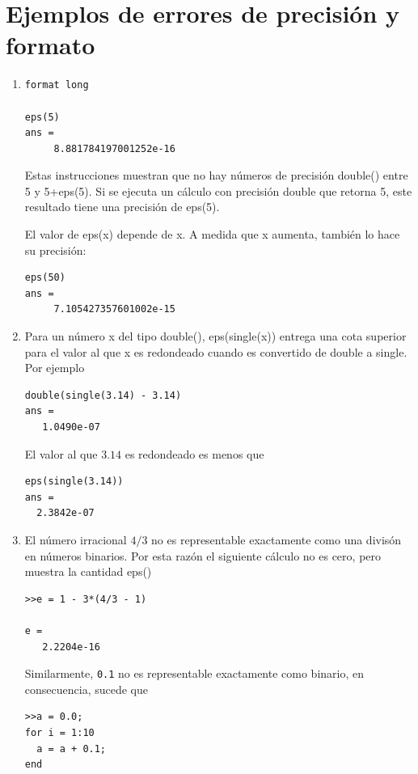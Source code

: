 \documentclass[12pt,letterpaper]{article}
\begin{document}
\section{\textbf{Ejemplos de errores de precisi\'on y formato}}

\begin{enumerate}

\item 
\begin{verbatim}
format long

eps(5)
ans =
     8.881784197001252e-16
\end{verbatim}

Estas instrucciones muestran que no hay n\'umeros de precisi\'on double() entre 5  y 5+eps(5). Si se ejecuta un c\'alculo con precisi\'on double 
que retorna 5, este resultado tiene una precisi\'on de eps(5).

El valor de eps(x) depende de x. A medida que x aumenta, tambi\'en lo hace su precisi\'on:

\begin{verbatim}
eps(50)
ans =
     7.105427357601002e-15
\end{verbatim}

\item  Para un n\'umero x del tipo double(), eps(single(x)) entrega una cota superior para el valor al que x es redondeado cuando es convertido de double a single. Por ejemplo

\begin{verbatim}
double(single(3.14) - 3.14)
ans =
   1.0490e-07
\end{verbatim}
El valor al que $3.14$ es redondeado es menos que 
\begin{verbatim}
eps(single(3.14))
ans =
  2.3842e-07
\end{verbatim}


\item El n\'umero irracional $4/3$ no es representable exactamente como una divis\'on en n\'umeros binarios. Por esta raz\'on el siguiente c\'alculo no es cero, pero muestra la cantidad eps()

\begin{verbatim}
>>e = 1 - 3*(4/3 - 1)

e =
   2.2204e-16
\end{verbatim}

Similarmente, \texttt{0.1} no es representable exactamente como binario, en consecuencia, sucede que 

\begin{verbatim}
>>a = 0.0;
for i = 1:10
  a = a + 0.1;
end


\end{verbatim}
\end{enumerate}
\end{document}
